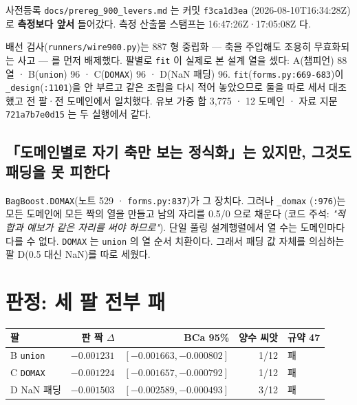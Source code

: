\documentclass{article}
\begin{document}
사전등록 \texttt{docs/prereg\_900\_levers.md} 는 커밋 \texttt{f3ca1d3ea}
(2026-08-10T16:34:28Z)로 \textbf{측정보다 앞서} 들어갔다. 측정 산출물 스탬프는 16:47:26Z·17:05:08Z 다.

배선 검사(\texttt{runners/wire900.py})는 887 형 중립화 — 축을 주입해도 조용히 무효화되는 사고 —
를 먼저 배제했다. 팔별로 \texttt{fit} 이 실제로 본 설계 열을 셌다:
A(챔피언) 88 열 · B(\texttt{union}) 96 · C(\texttt{DOMAX}) 96 · D(NaN 패딩) 96.
\texttt{fit}(\texttt{forms.py:669-683})이 \texttt{\_design}(\texttt{:1101})을 안 부르고 같은 조립을
다시 적어 놓았으므로 둘을 따로 세서 대조했고 전 팔·전 도메인에서 일치했다.
유보 가중 합 3{,}775 · 12 도메인 · 자료 지문 \texttt{721a7b7e0d15} 는 두 실행에서 같다.

\subsection{「도메인별로 자기 축만 보는 정식화」는 있지만, 그것도 패딩을 못 피한다}

\texttt{BagBoost.DOMAX}(노트 529 · \texttt{forms.py:837})가 그 장치다. 그러나 \texttt{\_domax}
(\texttt{:976})는 모든 도메인에 모든 짝의 열을 만들고 남의 자리를 0.5/0 으로 채운다
(코드 주석: \emph{"적합과 예보가 같은 자리를 써야 하므로"}).
단일 풀링 설계행렬에서 열 수는 도메인마다 다를 수 없다. \texttt{DOMAX} 는 \texttt{union} 의
열 순서 치환이다. 그래서 패딩 값 자체를 의심하는 팔 D(0.5 대신 NaN)를 따로 세웠다.

\section{판정: 세 팔 전부 패}

\begin{table}[h]\centering\small
\begin{tabular}{lrrrl}
\toprule
팔 & 판 짝 $\Delta$ & BCa 95\% & 양수 씨앗 & 규약 47 \\
\midrule
B \texttt{union}  & $-0.001231$ & $[-0.001663,-0.000802]$ & 1/12 & 패 \\
C \texttt{DOMAX}  & $-0.001224$ & $[-0.001657,-0.000792]$ & 1/12 & 패 \\
D NaN 패딩        & $-0.001503$ & $[-0.002589,-0.000493]$ & 3/12 & 패 \\
\bottomrule
\end{tabular}
\end{table}
\end{document}
